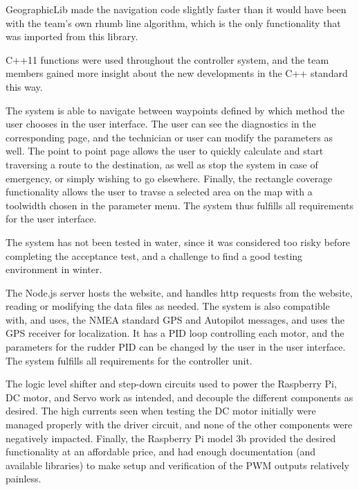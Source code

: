 GeographicLib made the navigation code slightly faster than it would have been with the team's own rhumb line algorithm, which is the only functionality that was imported from this library. 

C++11 functions were used throughout the controller system, and the team members gained more insight about the new developments in the C++ standard this way.

The system is able to navigate between waypoints defined by which method the user chooses in the user interface. The user can see the diagnostics in the corresponding page, and the technician or user can modify the parameters as well. The point to point page allows the user to quickly calculate and start traversing a route to the destination, as well as stop the system in case of emergency, or simply wishing to go elsewhere. Finally, the rectangle coverage functionality allows the user to travse a selected area on the map with a toolwidth chosen in the parameter menu. The system thus fulfills all requirements for the user interface. 

The system has not been tested in water, since it was considered too risky before completing the acceptance test, and a challenge to find a good testing environment in winter.

The Node.js server hosts the website, and handles http requests from the website, reading or modifying the data files as needed. %
The system is also compatible with, and uses, the NMEA standard GPS and Autopilot messages, and uses the GPS receiver for localization. It has a PID loop controlling each motor, and the parameters for the rudder PID can be changed by the user in the user interface. The system fulfills all requirements for the controller unit. 

The logic level shifter and step-down circuits used to power the Raspberry Pi, DC motor, and Servo work as intended, and decouple the different components as desired. The high currents seen when testing the DC motor initially were managed properly with the driver circuit, and none of the other components were negatively impacted. Finally, the Raspberry Pi model 3b provided the desired functionality at an affordable price, and had enough documentation (and available libraries) to make setup and verification of the PWM outputs relatively painless. 